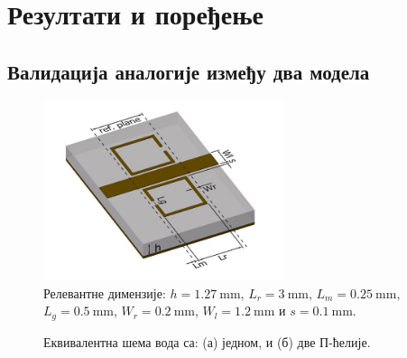 \section{Резултати и поређење}\label{tsm:sec:res}
\subsection{Валидација аналогије између два модела}
\begin{figure}[!t]
\centering
\includegraphics[width=7cm]{sl_tsm/dim3.jpeg}
\caption{Релевантне димензије:  $h = \SI{1.27}{\mm}$, $L_r = \SI{3}{\mm}$, $L_m = \SI{0.25}{\mm}$, $L_g = \SI{0.5}{\mm}$, $W_r = \SI{0.2}{\mm}$, $W_l = \SI{1.2}{\mm}$ и $s = \SI{0.1}{\mm}$.}
\label{tsm:dim}
\end{figure}
\begin{figure}
    \begin{center}
        \hfil
    \caption{Еквивалентна шема вода са: (а) једном, и (б) две П-ћелије.}
    \label{tsm:sl:vod2cel}
  \end{center}
\end{figure}
